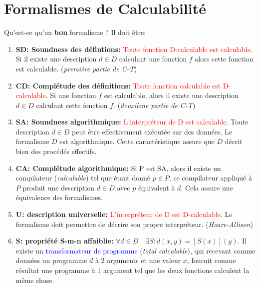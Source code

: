 \documentclass{report}
\begin{document}
\section{Formalismes de Calculabilité}
Qu'est-ce qu'un \textbf{bon} formalisme ?
Il doit être:
\begin{enumerate}
	\item \textbf{SD: Soundness des défintions:} \textcolor{red}{Toute fonction D-calculable est calculable}. Si il existe une description $d \in D$ calculant une fonction $f$ alors cette fonction est calculable. (\textit{première partie de C-T})
	\item \textbf{CD: Complétude des définitions:}  \textcolor{red}{Toute fonction calculable est D-calculable}. Si une fonction $f$ est calculable, alors il existe une description $d \in D$ calculant cette fonction $f$. (\textit{deuxième partie de C-T})
	\item \textbf{SA: Soundness algorithmique:} \textcolor{red}{L'interpréteur de D est calculable}. Toute description $d \in D$ peut être effectivement exécutée sur des données. Le formalisme $D$ est algorithmique. Cette caractéristique assure que $D$ décrit bien des procédés effectifs.
	\item \textbf{CA: Complétude algorithmique:} Si P est SA, alors il existe un compilateur (\textit{calculable}) tel que étant donné $p \in P$, ce compilateur appliqué à $P$ produit une description $d \in D$ avec $p$ équivalent à $d$. Cela assure une équivalence des formalismes.
	\item \textbf{U: description universelle:} \textcolor{red}{L'interpréteur de D est D-calculable}. Le formalisme doit permettre de décrire son propre interpréteur. (\textit{Hoare-Allison})
	\item \textbf{S: propriété S-m-n affaiblie:} $\forall d \in D \quad \exists S : d(x,y) = [S(x)](y)$. Il existe un \textcolor{blue}{transformateur de programme} (\textit{total calculable}), qui recevant comme données un programme $d$ à $2$ arguments et une valeur $x$, fournit comme résultat une programme à \textcolor{red}{$1$} argument tel que les deux fonctions calculent la même chose.
\end{enumerate}
\end{document}
